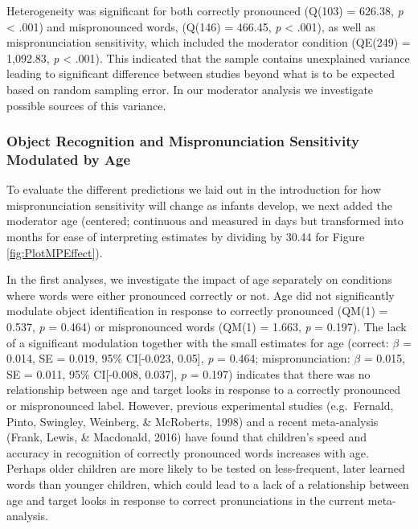 \documentclass[
  english,
  man, noextraspace]{apa6}
\begin{document}
Heterogeneity was significant for both correctly pronounced (Q(103) = 626.38, \emph{p} \textless{} .001) and mispronounced words, (Q(146) = 466.45, \emph{p} \textless{} .001), as well as mispronunciation sensitivity, which included the moderator condition (QE(249) = 1,092.83, \emph{p} \textless{} .001). This indicated that the sample contains unexplained variance leading to significant difference between studies beyond what is to be expected based on random sampling error. In our moderator analysis we investigate possible sources of this variance.

\hypertarget{object-recognition-and-mispronunciation-sensitivity-modulated-by-age}{%
\subsubsection{Object Recognition and Mispronunciation Sensitivity Modulated by Age}\label{object-recognition-and-mispronunciation-sensitivity-modulated-by-age}}

To evaluate the different predictions we laid out in the introduction for how mispronunciation sensitivity will change as infants develop, we next added the moderator age (centered; continuous and measured in days but transformed into months for ease of interpreting estimates by dividing by 30.44 for Figure \ref{fig:PlotMPEffect}).

In the first analyses, we investigate the impact of age separately on conditions where words were either pronounced correctly or not. Age did not significantly modulate object identification in response to correctly pronounced (QM(1) = 0.537, \emph{p} = 0.464) or mispronounced words (QM(1) = 1.663, \emph{p} = 0.197). The lack of a significant modulation together with the small estimates for age (correct: \(\beta\) = 0.014, SE = 0.019, 95\% CI{[}-0.023, 0.05{]}, \emph{p} = 0.464; mispronunciation: \(\beta\) = 0.015, SE = 0.011, 95\% CI{[}-0.008, 0.037{]}, \emph{p} = 0.197) indicates that there was no relationship between age and target looks in response to a correctly pronounced or mispronounced label. However, previous experimental studies (e.g.~Fernald, Pinto, Swingley, Weinberg, \& McRoberts, 1998) and a recent meta-analysis (Frank, Lewis, \& Macdonald, 2016) have found that children's speed and accuracy in recognition of correctly pronounced words increases with age. Perhaps older children are more likely to be tested on less-frequent, later learned words than younger children, which could lead to a lack of a relationship between age and target looks in response to correct pronunciations in the current meta-analysis.
\end{document}
